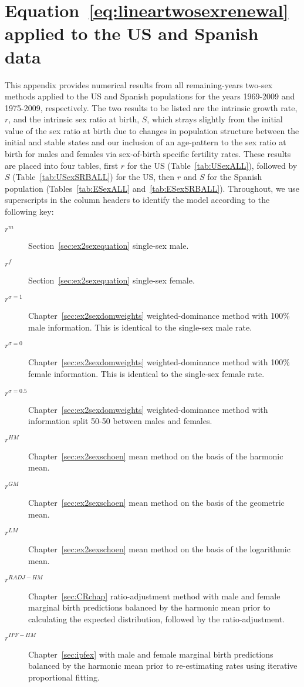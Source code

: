 
\chapter{Equation~\ref{eq:lineartwosexrenewal} applied to the US and Spanish
data}
\label{appendix:exallrestimates}

This appendix provides numerical results from all remaining-years two-sex
methods applied to the US and Spanish populations for the years 1969-2009 and
1975-2009, respectively. The two results to be listed are the intrinsic growth
rate, $r$, and the intrinsic sex ratio at birth, $S$, which strays slightly from
the initial value of the sex ratio at birth due to changes in population
structure between the initial and stable states and our inclusion of an
age-pattern to the sex ratio at birth for males and females via sex-of-birth
specific fertility rates. These results are placed into four tables, first $r$
for the US (Table~\ref{tab:USexALL}), followed by $S$
(Table~\ref{tab:USexSRBALL}) for the US, then $r$ and $S$ for the Spanish
population (Tables~\ref{tab:ESexALL} and~\ref{tab:ESexSRBALL}). Throughout, we
use superscripts in the column headers to identify the model according to the following key:
\begin{description}
  \item[$r^m$] Section~\ref{sec:ex2sexequation} single-sex male.
  \item[$r^f$] Section~\ref{sec:ex2sexequation} single-sex female.
  \item[$r^{\sigma=1}$] Chapter~\ref{sec:ex2sexdomweights} weighted-dominance
  method with 100\% male information. This is identical to the single-sex male rate.
  \item[$r^{\sigma=0}$] Chapter~\ref{sec:ex2sexdomweights} weighted-dominance
  method with 100\% female information. This is identical to the single-sex female rate.
  \item[$r^{\sigma=0.5}$] Chapter~\ref{sec:ex2sexdomweights} weighted-dominance
  method with information split 50-50 between males and females.
  \item[$r^{HM}$] Chapter~\ref{sec:ex2sexschoen} mean method on the basis of
  the harmonic mean.
  \item[$r^{GM}$] Chapter~\ref{sec:ex2sexschoen} mean method on the basis of
  the geometric mean.
  \item[$r^{LM}$] Chapter~\ref{sec:ex2sexschoen} mean method on the basis of
  the logarithmic mean.
  \item[$r^{RADJ-HM}$] Chapter~\ref{sec:CRchap} ratio-adjustment method with
  male and female marginal birth predictions balanced by the harmonic mean prior to
  calculating the expected distribution, followed by the ratio-adjustment.
  \item[$r^{IPF-HM}$] Chapter~\ref{sec:ipfex} with male and female marginal
  birth predictions balanced by the harmonic mean prior to re-estimating rates
  using iterative proportional fitting.
\end{description}

